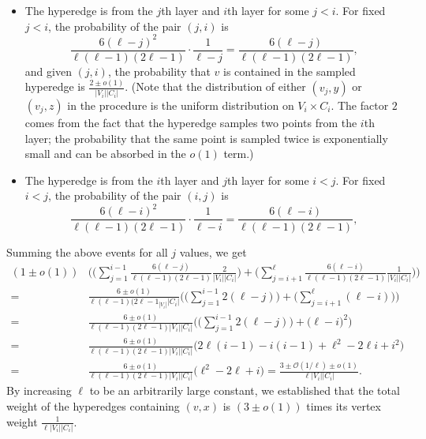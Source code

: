 \documentclass[10pt,a4paper]{amsart}
\renewcommand{\O}[1]{\ensuremath{\mathcal{O}\left(#1\right)}}
\begin{document}
\begin{itemize}
\item The hyperedge is from the $j$th layer and $i$th layer for some $j < i$. For fixed $j < i$, the probability of the pair $(j, i)$ is 
\[
\frac{6(\ell - j)^2}{\ell (\ell-1)(2\ell - 1)} \cdot \frac{1}{\ell - j}
= \frac{6(\ell - j)}{\ell (\ell-1)(2\ell - 1)}, \]
and given $(j, i)$, the probability that $v$ is contained in the sampled hyperedge is 
$\frac{2 \pm o(1)}{|V_i||C_i|}$.
(Note that the distribution of either $(v_j, y)$ or $(v_j, z)$ in the procedure is the uniform distribution on $V_i \times C_i$. The factor $2$ comes from the fact that the hyperedge samples two points from the $i$th layer; the probability that the same point is sampled twice is exponentially small and can be absorbed in the $o(1)$ term.)

\item The hyperedge is from the $i$th layer and $j$th layer for some $i < j$. For fixed $i < j$, the probability of the pair $(i, j)$ is 
\[
\frac{6(\ell - i)^2}{\ell (\ell-1)(2\ell - 1)} \cdot \frac{1}{\ell - i}
= \frac{6(\ell - i)}{\ell (\ell-1)(2\ell - 1)}, \]
\end{itemize}
Summing the above events for all $j$ values, we get
\begin{align*}
(1 \pm o(1)) &\bigg(  \big( \sum_{j=1}^{i-1} \frac{6(\ell - j)}{\ell (\ell-1)(2\ell - 1)} 
\frac{2}{|V_i||C_i|} \big) 
+
\big( \sum_{j=i+1}^{\ell} \frac{6(\ell - i)}{\ell (\ell-1)(2\ell - 1)} 
\frac{1}{|V_i||C_i|} \big) 
\bigg)  \\
=\quad& \frac{6 \pm o(1)}{\ell (\ell-1)(2\ell - 1_ |V_i||C_i|} \bigg(  \big( \sum_{j=1}^{i-1} 2(\ell - j) \big) 
+
\big( \sum_{j=i+1}^{\ell} (\ell - i)
 \big) \bigg) \\
 =\quad& \frac{6 \pm o(1)}{\ell (\ell-1)(2\ell - 1) |V_i||C_i|} \bigg(  \big( \sum_{j=1}^{i-1} 2(\ell - j) \big) 
+ \big( \ell - i \big)^2 \bigg) \\
=\quad& \frac{6 \pm o(1)}{\ell (\ell-1)(2\ell - 1) |V_i||C_i|} \bigg( 2\ell (i - 1) - i(i-1) + \ell^2 - 2 \ell i + i^2 \bigg) \\
=\quad& \frac{6 \pm o(1)}{\ell (\ell-1)(2\ell - 1) |V_i||C_i|} \bigg( \ell^2 - 2\ell + i \bigg) = \frac{3 \pm \O{1/\ell} \pm o(1)}{\ell |V_i||C_i|}. 
\end{align*}
By increasing $\ell$ to be an arbitrarily large constant, we established that the total weight of the hyperedges containing $(v, x)$ is $(3 \pm o(1))$ times its vertex weight $\frac{1}{\ell |V_i| |C_i|}$. 
\end{document}
